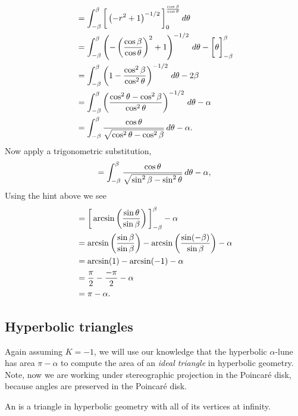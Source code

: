 \documentclass[newpage,hints,12pt,nooutcomes,noauthor]{ximera}
\begin{document}
\begin{problem}
\begin{freeResponse}
\begin{align*}
      &= \int_{-\beta}^\beta \bigg[ \left(-r^2+1\right)^{-1/2} \bigg]_0^{\frac{\cos \beta}{\cos\theta}}\,d \theta\\
      &= \int_{-\beta}^\beta \left(-\left(\frac{\cos \beta}{\cos\theta}\right)^2+1\right)^{-1/2}\,d\theta - \bigg[ \theta \bigg]_{-\beta}^\beta\\
      &= \int_{-\beta}^\beta \left(1-\frac{\cos^2 \beta}{\cos^2\theta}\right)^{-1/2}\,d \theta -2\beta\\
      &= \int_{-\beta}^\beta \left(\frac{\cos^2\theta - \cos^2 \beta}{\cos^2\theta}\right)^{-1/2} \,d \theta-\alpha\\
      &= \int_{-\beta}^\beta \frac{\cos\theta}{\sqrt{\cos^2\theta - \cos^2 \beta}}\,d \theta - \alpha.
    \end{align*}
    Now apply a trigonometric substitution,
    \[
    = \int_{-\beta}^\beta \frac{\cos\theta}{\sqrt{\sin^2\beta - \sin^2 \theta}}\,d \theta- \alpha,
    \]
    Using the hint above we see
    \begin{align*}
      &= \bigg[ \arcsin\left(\frac{\sin\theta}{\sin\beta}\right) \bigg]_{-\beta}^\beta - \alpha\\
      &= \arcsin\left(\frac{\sin\beta}{\sin\beta}\right)- \arcsin\left(\frac{\sin(-\beta)}{\sin\beta}\right)- \alpha\\
      &= \arcsin(1)-\arcsin(-1)-\alpha\\
      &= \frac{\pi}{2}-\frac{-\pi}{2}-\alpha\\
      &= \pi-\alpha.
    \end{align*}
  \end{freeResponse}
\end{problem}


\subsection{Hyperbolic triangles}

Again assuming $K=-1$, we will use our knowledge that the hyperbolic
$\alpha$-lune has area $\pi-\alpha$ to compute the area of an
\textit{ideal triangle} in hyperbolic geometry. Note, now we are
working under stereographic projection in the Poincar\'e disk, because
angles are preserved in the Poincar\'e disk.

\begin{definition}
  An  is a triangle in hyperbolic geometry with all of
  its vertices at infinity.
\end{definition}
\end{document}
